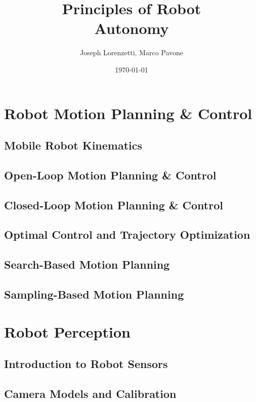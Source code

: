 \documentclass[nohyper,nobib]{tufte-book}
\title{Principles of Robot\\ Autonomy}
\author{Joseph Lorenzetti, Marco Pavone}
\date{\today}
\begin{document}
\maketitle



\tableofcontents

\part{Robot Motion Planning \& Control}
\chapter{Mobile Robot Kinematics}

\chapter{Open-Loop Motion Planning \& Control}

\chapter{Closed-Loop Motion Planning \& Control}

\chapter{Optimal Control and Trajectory Optimization}

\chapter{Search-Based Motion Planning}

\chapter{Sampling-Based Motion Planning}


\part{Robot Perception}
\chapter{Introduction to Robot Sensors}

\chapter{Camera Models and Calibration}

\end{document}
